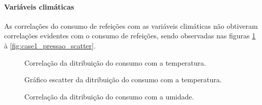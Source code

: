 \documentclass[	12pt, Times, openright, twoside, a4paper, english, brazil]{abntex2}
\begin{document}
              \paragraph{Variáveis climáticas}
                As correlações do consumo de refeições com as variáveis climáticas não obtiveram correlações evidentes com o consumo de refeições, sendo observadas nas figuras \ref{fig:case1_temperatura} à \ref{fig:case1_pressao_scatter}.
                \begin{figure}[!ht]
                    	\caption{Correlação da ditribuição do consumo com a temperatura. \label{fig:case1_temperatura} }
                    \end{figure}
                
                \begin{figure}[!ht]
                	\caption{Gráfico escatter da ditribuição do consumo com a temperatura. \label{fig:case1_temperatura_scatter_consumo} }
                \end{figure}
                 \begin{figure}[!ht]
                    	\caption{Correlação da ditribuição do consumo com a umidade. \label{fig:case1_umidade} }
                    \end{figure}
                
\end{document}
